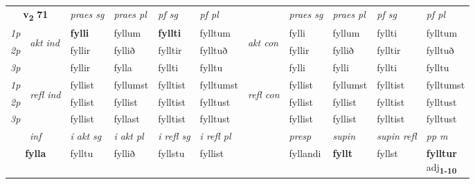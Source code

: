 \noindent
\begin{tabular}{lllllllllll} \toprule
\multicolumn{2}{c}{\textbf{v{\textsubscript{2}}} \Large{\textbf{71}}}  &  \textit{praes sg}  & \textit{praes pl}  &\textit{ pf sg} & \textit{pf pl} &  &  \textit{praes sg}  & \textit{praes pl}  & \textit{pf sg} & \textit{pf pl } \\*
	\cmidrule{3-6} \cmidrule{8-11}
 {\textit{1p}} & \multirow{3}{*}{\begin{turn}{90}\textit{akt ind}\end{turn}} & \textbf{fylli} & fyllum & \textbf{fyllti} & fylltum & \multirow{3}{*}{\begin{turn}{90}\textit{akt con}\end{turn}} &fylli & fyllum & fyllti & fylltum\\*
 {\textit{2p}} &  &  fyllir  & fyllið & fylltir & fylltuð & & fyllir & fyllið & fylltir & fylltuð \\*
{\textit{3p}} &  & fyllir & fylla & fyllti & fylltu & & fylli & fylli& fyllti & fylltu \\*
\cmidrule{3-6} \cmidrule{8-11}
 {\textit{1p}} & \multirow{3}{*}{\begin{turn}{90}\textit{refl ind}\end{turn}}  & fyllist & fyllumst & fylltist & fylltumst & \multirow{3}{*}{\begin{turn}{90}\textit{refl con}\end{turn}}  &fyllist & fyllumst & fylltist & fylltumst \\*
 {\textit{2p}} &  & fyllist & fyllist & fylltist & fylltust & &fyllist & fyllist & fylltist & fylltust \\*
 {\textit{3p}}  & & fyllist & fyllast & fylltist & fylltust & & fyllist & fyllist& fylltist & fylltust \\*
\cmidrule{3-6} \cmidrule{8-11}

   \multicolumn{2}{c}{\textit{inf}}  & \textit{i akt sg} & \textit{i akt pl} & \textit{i refl sg} & \textit{i refl pl} && \textit{presp} & \textit{supin} & \textit{supin refl} & \textit{pp m} \\*
  \multicolumn{2}{c}{\textbf{fylla}} & fylltu  & fyllið & fyllstu & fyllist && fyllandi &  \textbf{fyllt} & fyllst & \specialcell{\textbf{fylltur} \\ adj\textbf{\textsubscript{1-10}}} \\*
\end{tabular}

